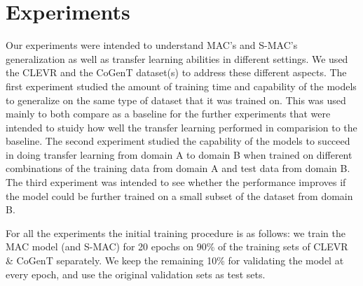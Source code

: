 \section{Experiments}

Our experiments were intended to understand MAC's and S-MAC's generalization as well as transfer learning abilities in different settings. We used the CLEVR and the CoGenT dataset(s) to address these different aspects.
The first experiment studied the amount of training time and capability of the models to generalize on the same type of dataset that it was trained on. This was used mainly to both compare as a baseline for the further experiments that were intended to stuidy how well the transfer learning performed in comparision to the baseline.
The second experiment studied the capability of the models to succeed in doing transfer learning from domain A to domain B when trained on different combinations of the training data from domain A and test data from domain B. The third experiment was intended to see whether the performance improves if the model could be further trained on a small subset of the dataset from domain B.


For all the experiments the initial training procedure is as follows: we train the MAC model (and S-MAC) for 20 epochs on 90\% of the training sets of CLEVR \& CoGenT separately. We keep the remaining 10\% for validating the model at every epoch, and use the original validation sets as test sets.

